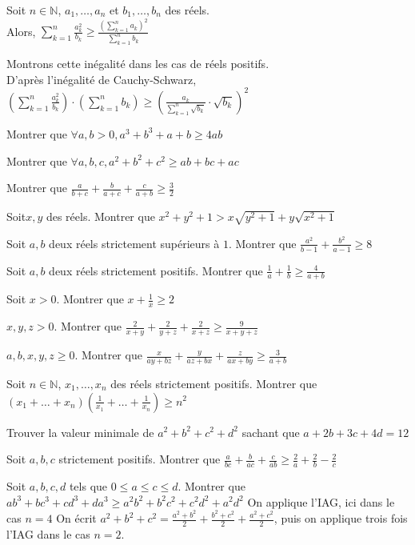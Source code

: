  Soit $n\in\mathbb{N}$, $a_1, \dots, a_n$ et $b_1, \dots, b_n$ des réels.\\ Alors, $\sum_{k=1}^n\frac{a_k^2}{b_k} \geq \frac{(\sum_{k=1}^na_k)^2}{\sum_{k=1}^n b_k}$

\preuve Montrons cette inégalité dans les cas de réels positifs. \\ D'après l'inégalité de Cauchy-Schwarz, $(\sum_{k=1}^n\frac{a_k^2}{b_k})\cdot (\sum_{k=1}^nb_k) \geq (\frac{a_k}{\sum_{k=1}^n\sqrt{b_k}}\cdot \sqrt{b_k})^2$

\exo Montrer que $\forall a, b >0, a^3 + b^3 + a+b \geq 4ab$

\exo Montrer que $\forall a, b, c, a^2 + b^2+c^2 \geq ab+bc+ac$

Montrer que $\frac{a}{b+c} + \frac{b}{a+c} + \frac{c}{a+b} \geq \frac{3}{2} $

\exo Soit$x, y$ des réels. Montrer que $x^2+y^2+1> x\sqrt{y^2+1} + y\sqrt{x^2+1}$

\exo Soit $a, b$ deux réels strictement supérieurs à $1$. Montrer que $\frac{a^2}{b-1} + \frac {b^2}{a-1} \geq 8$

\exo Soit $a, b$ deux réels strictement positifs. Montrer que $\frac{1}{a} + \frac{1}{b} \geq \frac{4}{a+b}$

\exo Soit $x>0$. Montrer que $x+\frac{1}{x} \geq 2$

\exo $x, y, z >0$. Montrer que $\frac{2}{x+y} + \frac{2}{y+z} + \frac{2}{x+z} \geq \frac{9}{x+y+z}$

\exo $a, b, x, y, z \geq 0$. Montrer que $\frac{x}{ay+bz} + \frac{y}{az+bx} + \frac{z}{ax+by} \geq \frac{3}{a+b}$

\exo Soit $n\in \mathbb{N}$, $x_1, \dots, x_n$ des réels strictement positifs. Montrer que $(x_1+\dots+x_n)(\frac{1}{x_1}+\dots+\frac{1}{x_n}) \geq n^2$

\exo Trouver la valeur minimale de $a^2+b^2+c^2+d^2$ sachant que $a+2b+3c+4d =12$ 

\exo Soit $a, b, c$ strictement positifs. Montrer que $\frac{a}{bc}+\frac{b}{ac}+\frac{c}{ab} \geq \frac{2}{a}+\frac{2}{b}-\frac{2}{c}$

\exo Soit $a, b, c, d$ tels que $0\leq a\leq c \leq d$. Montrer que $ab^3+bc^3+cd^3+da^3 \geq a^2b^2 + b^2c^2+c^2d^2+a^2d^2$
\sol On applique l'IAG, ici dans le cas $n=4$
\sol On écrit $a^2+b^2+c^2 = \frac{a^2+b^2}{2}+\frac{b^2+c^2}{2}+\frac{a^2+c^2}{2}$, puis on applique trois fois l'IAG dans le cas $n=2$. 

